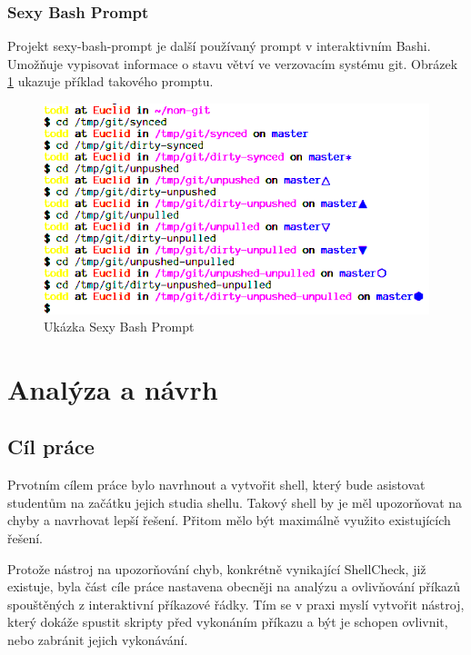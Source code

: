 \documentclass[thesis=M,czech]{FITthesis}[2012/06/26]
\begin{document}

\subsection{Sexy Bash Prompt}

Projekt sexy-bash-prompt je další používaný prompt v interaktivním Bashi. Umožňuje vypisovat informace o stavu větví ve verzovacím systému git. Obrázek \ref{fig:sexy_prompt} ukazuje příklad takového promptu.

\begin{figure}[htb]\centering
	\includegraphics[width=\textwidth]{./images/sexy_prompt_edited}
	\caption{Ukázka Sexy Bash Prompt}
	\label{fig:sexy_prompt}
\end{figure}




%
%
%
\chapter{Analýza a návrh}

%
%
%
\section{Cíl práce}

Prvotním cílem práce bylo navrhnout a vytvořit shell, který bude asistovat studentům na začátku jejich studia shellu. Takový shell by je měl upozorňovat na chyby a navrhovat lepší řešení. Přitom mělo být maximálně využito existujících řešení.

Protože nástroj na upozorňování chyb, konkrétně vynikající ShellCheck, již existuje, byla část cíle práce nastavena obecněji na analýzu a ovlivňování příkazů spouštěných z interaktivní příkazové řádky. Tím se v praxi myslí vytvořit nástroj, který dokáže spustit skripty před vykonáním příkazu a být je schopen ovlivnit, nebo zabránit jejich vykonávání.
\end{document}
